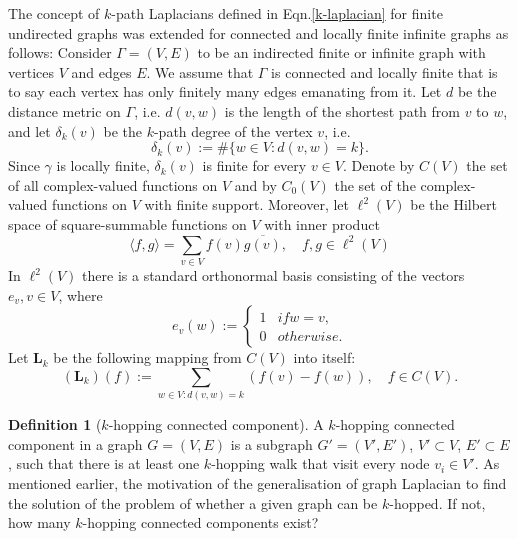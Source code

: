 \documentclass[10pt,a4paper]{article}
\theoremstyle{plain}
\theoremstyle{definition}
\newtheorem{defn}[subsection]{Definition}
\begin{document}
    	    The concept of $k$-path Laplacians defined in Eqn.\ref{k-laplacian} for finite undirected graphs was extended for connected and locally finite infinite graphs as follows:
    	    Consider $\Gamma = (V,E)$ to be an indirected finite or infinite graph with vertices $V$ and edges $E$. We assume that $\Gamma$ is connected and locally finite that is to say each vertex has only finitely many edges emanating from it. Let $d$ be the distance metric on $\Gamma$, i.e. $d(v,w)$ is the length of the shortest path from $v$ to $w$, and let $\delta_{k}(v)$ be the $k$-path degree of the vertex $v$, i.e.
    	    \begin{equation}
    	    \delta_{k}(v) := \#\{w \in V : d(v,w) = k\}.
    	    \end{equation}
    	    Since $\gamma$ is locally finite, $\delta_{k}(v)$ is finite for every $v \in V$. Denote by $C(V)$ the set of all complex-valued functions on $V$ and by $C_{0}(V)$ the set of the complex-valued functions on $V$ with finite support. Moreover, let $\ell^2(V)$ be the Hilbert space of square-summable functions on $V$ with inner product
    	    \begin{equation}
    	    \langle f,g\rangle = \sum_{v\in V} f(v) \overline{g(v)}, \quad f,g \in \ell^2(V) 
    	    \end{equation}
    	    In $\ell^2(V)$ there is a standard orthonormal basis consisting of the vectors $e_v, v\in V$, where
    	    \begin{equation}
    	    e_v(w) :=  \begin{cases*}
    	    1 & if  w = v,  \\
    	    0 & otherwise.
    	    \end{cases*}
    	    \end{equation}
    	    Let $\mathbf{L}_{k}$ be the following mapping from $C(V)$ into itself:
    	    \begin{equation}
    	    (\mathbf{L}_{k}) (f) := \sum_{w\in V: d(v,w)=k} (f(v) -f(w)), \quad f \in C(V).
    	    \label{infinite-dif}
    	    \end{equation}
    	    
    	    
    	    \begin{defn}[$k$-hopping connected component]
    	    	A $k$-hopping connected component in a graph $G=(V,E)$ is a subgraph $G' = (V',E')$, $V'\subset V$, $E' \subset E$, such that there is at least one $k$-hopping walk that visit every node $v_i \in V'$.
    	    	As mentioned earlier, the motivation of the generalisation of graph Laplacian to find the solution of the problem of whether a given graph can be $k$-hopped. If not, how many $k$-hopping connected components exist?\\
    	    \end{defn}
    	    
\end{document}

